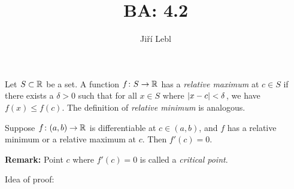 \documentclass[10pt,aspectratio=149]{beamer}
\author{Ji\v{r}\'i Lebl}
\institute[OSU]{%
Departemento pri Matematiko de Oklahoma {\^S}tata Universitato}
\title{BA: 4.2}
\date{}
\begin{document}
\begin{frame}
\titlepage
\end{frame}

\begin{frame}
\begin{definition}
Let $S \subset {\mathbb{R}}$ be a set.
A function
$f \colon S \to {\mathbb{R}}$ has a \emph{relative maximum}
at $c \in S$ if there exists a $\delta>0$
such that for all $x \in S$ where $\left\lvert {x-c} \right\rvert < \delta$,
we have $f(x) \leq f(c)$.
\pause
The definition of
\emph{relative minimum}
is analogous.
\end{definition}

\pause
\begin{lemma}
Suppose $f \colon (a,b) \to {\mathbb{R}}$ is differentiable at $c \in (a,b)$,
and $f$ has
a relative minimum or a relative maximum at $c$.  Then
$f'(c) = 0$.
\end{lemma}

\pause
\textbf{Remark:}  Point $c$ where $f'(c)=0$ is called a
\emph{critical point}.

\pause
\medskip

Idea of proof:

\vspace*{-12pt}
\phantom{Idea of proof:~~~~}

\end{frame}
\end{document}
